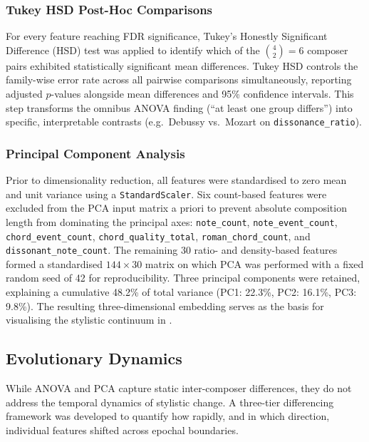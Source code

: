 \documentclass[]{interact}
\theoremstyle{plain}
\theoremstyle{definition}
\theoremstyle{remark}
\begin{document}
\subsubsection{Tukey HSD Post-Hoc Comparisons}

For every feature reaching FDR significance, Tukey's Honestly Significant
Difference (HSD) test was applied to identify which of the $\binom{4}{2} = 6$
composer pairs exhibited statistically significant mean differences. Tukey HSD
controls the family-wise error rate across all pairwise comparisons
simultaneously, reporting adjusted $p$-values alongside mean differences and
95\% confidence intervals. This step transforms the omnibus ANOVA finding (``at
least one group differs'') into specific, interpretable contrasts (e.g.\
Debussy vs.\ Mozart on \texttt{dissonance\_ratio}).

\subsubsection{Principal Component Analysis}

Prior to dimensionality reduction, all features were standardised to zero mean
and unit variance using a \texttt{StandardScaler}. Six count-based features were
excluded from the PCA input matrix a priori to prevent absolute composition length from
dominating the principal axes: \texttt{note\_count},
\texttt{note\_event\_count}, \texttt{chord\_event\_count},
\texttt{chord\_quality\_total}, \texttt{roman\_chord\_count}, and
\texttt{dissonant\_note\_count}. The remaining 30 ratio- and density-based
features formed a standardised $144 \times 30$ matrix on which PCA was
performed with a fixed random seed of 42 for reproducibility. Three principal
components were retained, explaining a cumulative 48.2\% of total variance
(PC1: 22.3\%, PC2: 16.1\%, PC3: 9.8\%). The resulting three-dimensional
embedding serves as the basis for visualising the stylistic continuum in
\Cref{sec:results}.

\subsection{Evolutionary Dynamics}

While ANOVA and PCA capture static inter-composer differences, they do not
address the temporal dynamics of stylistic change. A three-tier differencing
framework was developed to quantify how rapidly, and in which direction,
individual features shifted across epochal boundaries.
\end{document}
